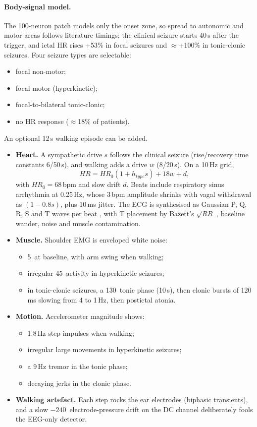 \paragraph{Body-signal model.} The 100-neuron patch models only the onset zone, so spread to autonomic and motor areas follows literature timings: the clinical seizure starts 40\,s after the trigger, and ictal HR rises +53\% in focal seizures \cite{hampel2016} and $\approx$+100\% in tonic-clonic seizures. Four seizure types are selectable:
\begin{itemize}
\item focal non-motor;
\item focal motor (hyperkinetic);
\item focal-to-bilateral tonic-clonic;
\item no HR response ($\approx$18\% of patients).
\end{itemize}
An optional 12\,s walking episode can be added.
\begin{itemize}
\item \textbf{Heart.} A sympathetic drive $s$ follows the clinical seizure (rise/recovery time constants 6/50\,s), and walking adds a drive $w$ (8/20\,s). On a 10\,Hz grid,
\[HR = HR_0(1+h_{type}s) + 18w + d,\]
with $HR_0=68$\,bpm and slow drift $d$. Beats include respiratory sinus arrhythmia at 0.25\,Hz, whose 3\,bpm amplitude shrinks with vagal withdrawal as $(1-0.8s)$, plus 10\,ms jitter. The ECG is synthesised as Gaussian P, Q, R, S and T waves per beat \cite{mcsharry2003}, with T placement by Bazett's $\sqrt{RR}$ \cite{bazett1920}, baseline wander, noise and muscle contamination.
\item \textbf{Muscle.} Shoulder EMG is enveloped white noise:
\begin{itemize}
\item 5\,\uV{} at baseline, with arm swing when walking;
\item irregular 45\,\uV{} activity in hyperkinetic seizures;
\item in tonic-clonic seizures, a 130\,\uV{} tonic phase (10\,s), then clonic bursts of 120\,ms slowing from 4 to 1\,Hz, then postictal atonia.
\end{itemize}
\item \textbf{Motion.} Accelerometer magnitude shows:
\begin{itemize}
\item 1.8\,Hz step impulses when walking;
\item irregular large movements in hyperkinetic seizures;
\item a 9\,Hz tremor in the tonic phase;
\item decaying jerks in the clonic phase.
\end{itemize}
\item \textbf{Walking artefact.} Each step rocks the ear electrodes (biphasic transients), and a slow $-240$\,\uV{} electrode-pressure drift on the DC channel deliberately fools the EEG-only detector.
\end{itemize}

